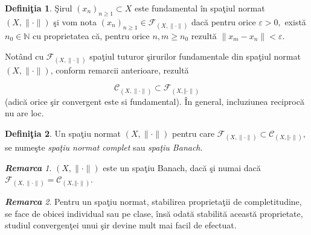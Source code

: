 \documentclass[ a4paper, 12pt]{report}
\theoremstyle{definition}
\newtheorem{definition}{\bf Defini\c tia}[section]
\theoremstyle{remark}
\newtheorem{remarc}{\bf Remarca}[section]
\numberwithin{equation}{section}
\begin{document}
\begin{definition}
\c Sirul $(x_n)_{n \geq 1} \subset X$ este fundamental \^in spa\c tiul normat $(X, \lVert \cdot \rVert)$ \c si vom nota $(x_n)_{n \geq 1} \in \mathcal{F}_{(X, \lVert \cdot \rVert)}$ dac\u a pentru orice $\varepsilon >0,$ exist\u a $n_0 \in \mathbb{N}$ cu proprietatea c\u a,  pentru orice $n,m \geq n_0$ rezult\u a $\lVert x_m - x_n \rVert < \varepsilon.$
\end{definition}

\smallskip

Not\^ and cu $\mathcal{F}_{(X, \lVert \cdot \rVert)}$ spa\c tiul tuturor \c sirurilor fundamentale din spa\c tiul normat $(X, \lVert \cdot \rVert)$, conform remarcii anterioare, rezult\u a

$$\mathcal{C}_{(X, \lVert \cdot \rVert)} \subset \mathcal{F}_{(X, \Vert \cdot \rVert)}$$ (adic\u a orice \c sir convergent este si fundamental).
\^In general, incluziunea reciproc\u a nu are loc.


\begin{definition}
Un spa\c tiu normat $(X, \lVert \cdot \rVert)$ pentru care $\mathcal{F}_{(X, \lVert \cdot \rVert)} \subset \mathcal{C}_{(X, \Vert \cdot \rVert)}$, se nume\c ste \textit{spa\c tiu normat complet} sau \textit{spa\c tiu Banach}.
\end{definition}

\begin{remarc}
$(X, \lVert \cdot \rVert)$ este un spa\c tiu Banach, dac\u a \c si numai dac\u a $\mathcal{F}_{(X, \lVert \cdot \rVert)} = \mathcal{C}_{(X, \Vert \cdot \rVert)}$.
\end{remarc}

\begin{remarc}
Pentru un spa\c tiu normat, stabilirea proprieta\c tii de completitudine, se face de obicei individual sau pe clase, \^ins\u a odat\u a stabilit\u a aceast\u a proprietate, studiul convergen\c tei unui \c sir devine mult mai facil de efectuat.
\end{remarc}
\end{document}
